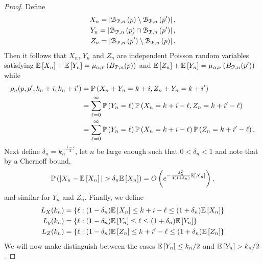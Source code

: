 \begin{proof}
Define
\begin{align*}
	X_n = \left|{\mathcal B}_{{\mathcal P},n}\left(p\right) \setminus {\mathcal B}_{{\mathcal P},n}\left(p^\prime\right)\right|,\\
	Y_n = \left|{\mathcal B}_{{\mathcal P},n}\left(p\right) \cap {\mathcal B}_{{\mathcal P},n}\left(p^\prime\right)\right|,\\
	Z_n = \left|{\mathcal B}_{{\mathcal P},n}\left(p^\prime\right) \setminus {\mathcal B}_{{\mathcal P},n}\left(p\right)\right|.
\end{align*}
Then it follows that $X_n$, $Y_n$ and $Z_n$ are independent Poisson random variables satisfying $\mathbb{E}\left[X_n\right] + \mathbb{E}\left[Y_n\right] = \mu_{\alpha,\nu}\left(B_{{\mathcal P},n}(p)\right)$ and $\mathbb{E}\left[Z_n\right] + \mathbb{E}\left[Y_n\right] = \mu_{\alpha,\nu}\left(B_{{\mathcal P},n}(p^\prime)\right)$ while
\begin{align*}
	\rho_n(p,p^\prime,k_n + i,k_n + i^\prime) &= \mathbb{P}\left(X_n + Y_n = k + i, Z_n + Y_n = k + i^\prime\right)\\
	&= \sum_{\ell = 0}^\infty \mathbb{P}\left(Y_n = \ell\right) \mathbb{P}\left(X_n = k + i - \ell, Z_n = k + i^\prime - \ell\right) \\
	&= \sum_{\ell = 0}^\infty \mathbb{P}\left(Y_n = \ell\right) \mathbb{P}\left(X_n = k + i - \ell\right) \mathbb{P}\left(Z_n = k + i^\prime - \ell\right).
\end{align*}
Next define $\delta_n = k_n^{-\frac{1-\varepsilon}{2}}$, let $n$ be large enough such that $0 < \delta_n < 1$ and note that by a Chernoff bound,
\[
	\mathbb{P}\left(|X_n - \mathbb{E}\left[X_n\right]| > \delta_n \mathbb{E}\left[X_n\right]\right) = O\left(e^{-\frac{\delta_n^2}{4(1+\delta_n)} \mathbb{E}\left[X_n\right]}\right),
\]
and similar for $Y_n$ and $Z_n$. Finally, we define
\begin{align*}
	L_X(k_n) &= \left\{\ell : (1 - \delta_n) \mathbb{E}\left[X_n\right] \le k + i - \ell \le (1+\delta_n)\mathbb{E}\left[X_n\right]\right\} \\
	L_y(k_n) &= \left\{\ell : (1 - \delta_n) \mathbb{E}\left[Y_n\right] \le \ell \le (1+\delta_n)\mathbb{E}\left[Y_n\right]\right\}\\
	L_Z(k_n) &= \left\{\ell : (1 - \delta_n) \mathbb{E}\left[Z_n\right] \le k + i^\prime - \ell \le (1+\delta_n)\mathbb{E}\left[Z_n\right]\right\}
\end{align*}
We will now make distinguish between the cases $\mathbb{E}\left[Y_n\right] \le k_n/2$ and $\mathbb{E}\left[Y_n\right] > k_n/2$. 


\end{proof}
